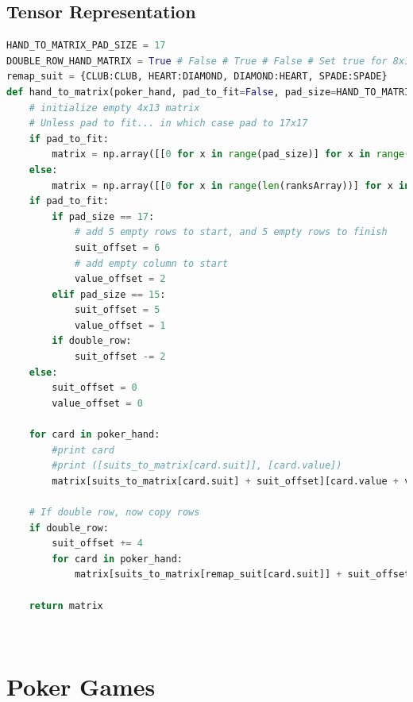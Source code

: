 \documentclass[review]{elsarticle}
\begin{document}
\subsection{Tensor Representation}
\begin{lstlisting}[language=Python, caption=Unified Representation for Poker Games]
HAND_TO_MATRIX_PAD_SIZE = 17
DOUBLE_ROW_HAND_MATRIX = True # False # True # False # Set true for 8x13 matrix, with redundancy. 
remap_suit = {CLUB:CLUB, HEART:DIAMOND, DIAMOND:HEART, SPADE:SPADE}
def hand_to_matrix(poker_hand, pad_to_fit=False, pad_size=HAND_TO_MATRIX_PAD_SIZE, double_row=DOUBLE_ROW_HAND_MATRIX):
    # initialize empty 4x13 matrix
    # Unless pad to fit... in which case pad to 17x17
    if pad_to_fit:
        matrix = np.array([[0 for x in range(pad_size)] for x in range(pad_size)], np.int32)
    else:
        matrix = np.array([[0 for x in range(len(ranksArray))] for x in range(len(suitsArray))], np.int32)
    if pad_to_fit:
        if pad_size == 17:
            # add 5 empty rows to start, and 5 empty rows to finish
            suit_offset = 6
            # add empty column to start 
            value_offset = 2
        elif pad_size == 15:
            suit_offset = 5
            value_offset = 1
        if double_row:
            suit_offset -= 2
    else:
        suit_offset = 0
        value_offset = 0

    for card in poker_hand:
        #print card
        #print ([suits_to_matrix[card.suit]], [card.value])
        matrix[suits_to_matrix[card.suit] + suit_offset][card.value + value_offset] = 1

    # If double row, now copy rows
    if double_row:
        suit_offset += 4
        for card in poker_hand:
            matrix[suits_to_matrix[remap_suit[card.suit]] + suit_offset][card.value + value_offset] = 1
        
    return matrix
\end{lstlisting}
~\cite{moscow25} \\

\section{Poker Games}
\end{document}
